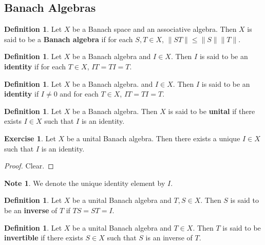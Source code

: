 \documentclass[12pt]{amsart}
\theoremstyle{definition}
\newtheorem{defn}[definition]{Definition}
\newtheorem{note}[definition]{Note}
\newtheorem{ex}[definition]{Exercise}
\newcommand{\lex}[1]{\label{ex:#1}}
\newcommand{\ld}[1]{\label{defn:#1}}
\begin{document}
\newpage
	\subsection{Banach Algebras}
	
	\begin{defn} \ld{}
		Let $X$ be a Banach space and an associative algebra. Then $X$ is said to be a \textbf{Banach algebra} if for each $S,T \in X$, $\|ST \|\leq \|S \|\|T \|$. 
	\end{defn}
	
	\begin{defn} \ld{}
	Let $X$ be a Banach algebra and $I \in X$. Then $I$ is said to be an \textbf{identity} if for each $T \in X$, $IT = TI = T$. 
	\end{defn}
	
	\begin{defn} \ld{}
	Let $X$ be a Banach algebra. and $I \in X$. Then $I$ is said to be an \textbf{identity} if $I \neq 0$ and for each $T \in X$, $IT = TI = T$.
	\end{defn}
	
	\begin{defn} \ld{}
	Let $X$ be a Banach algebra. Then $X$ is said to be \textbf{unital} if there exists $I \in X$ such that $I$ is an identity.
	\end{defn}	
		
		\begin{ex} \lex{}
		Let $X$ be a unital Banach algebra. Then there exists a unique $I \in X$ such that $I$ is an identity.
		\end{ex} 
		
		\begin{proof}
		Clear.
		\end{proof}
		
		\begin{note}
		We denote the unique identity element by $I$.
		\end{note}
		
		\begin{defn} \ld{}
		Let $X$ be a unital Banach algebra and $T,S \in X$. Then $S$ is said to be an 
		\textbf{inverse} of $T$ if $TS=ST = I$.
		\end{defn}

		\begin{defn} \ld{}
		Let $X$ be a unital Banach algebra and $T \in X$. 			Then $T$ is said to be 
		\textbf{invertible} if there exists $S \in X$ such 		that $S$ is an inverse of $T$.
		\end{defn}
		
\end{document}
